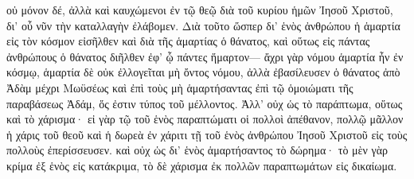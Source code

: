 \documentclass{openreader}
\begin{document}
οὐ μόνον δέ, ἀλλὰ καὶ καυχώμενοι ἐν τῷ θεῷ διὰ τοῦ κυρίου ἡμῶν Ἰησοῦ Χριστοῦ, δι’ οὗ νῦν τὴν καταλλαγὴν ἐλάβομεν. 
Διὰ τοῦτο ὥσπερ δι’ ἑνὸς ἀνθρώπου ἡ ἁμαρτία εἰς τὸν κόσμον εἰσῆλθεν καὶ διὰ τῆς ἁμαρτίας ὁ θάνατος, καὶ οὕτως εἰς πάντας ἀνθρώπους ὁ θάνατος διῆλθεν ἐφ’ ᾧ πάντες ἥμαρτον— 
ἄχρι γὰρ νόμου ἁμαρτία ἦν ἐν κόσμῳ, ἁμαρτία δὲ οὐκ ἐλλογεῖται μὴ ὄντος νόμου, 
ἀλλὰ ἐβασίλευσεν ὁ θάνατος ἀπὸ Ἀδὰμ μέχρι Μωϋσέως καὶ ἐπὶ τοὺς μὴ ἁμαρτήσαντας ἐπὶ τῷ ὁμοιώματι τῆς παραβάσεως Ἀδάμ, ὅς ἐστιν τύπος τοῦ μέλλοντος. 
Ἀλλ’ οὐχ ὡς τὸ παράπτωμα, οὕτως καὶ τὸ χάρισμα· εἰ γὰρ τῷ τοῦ ἑνὸς παραπτώματι οἱ πολλοὶ ἀπέθανον, πολλῷ μᾶλλον ἡ χάρις τοῦ θεοῦ καὶ ἡ δωρεὰ ἐν χάριτι τῇ τοῦ ἑνὸς ἀνθρώπου Ἰησοῦ Χριστοῦ εἰς τοὺς πολλοὺς ἐπερίσσευσεν. 
καὶ οὐχ ὡς δι’ ἑνὸς ἁμαρτήσαντος τὸ δώρημα· τὸ μὲν γὰρ κρίμα ἐξ ἑνὸς εἰς κατάκριμα, τὸ δὲ χάρισμα ἐκ πολλῶν παραπτωμάτων εἰς δικαίωμα. 
\end{document}
